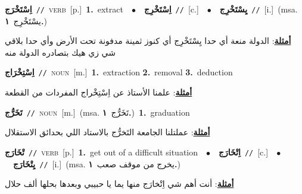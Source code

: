 \documentclass[10pt,a4paper,twoside]{article} %
\begin{document}
\begin{multicols}{2}
{\setlength\topsep{0pt}\textbf{\foreignlanguage{arabic}{اِسْتَخْرَج}}\ {\color{gray}\texttt{//}\color{black}}\ \textsc{verb}\ [p.]\ \textbf{1.}~extract\ \ $\bullet$\ \ \setlength\topsep{0pt}\textbf{\foreignlanguage{arabic}{اِسْتَخْرِج}}\ {\color{gray}\texttt{//}\color{black}}\ [c.]\ \ $\bullet$\ \ \setlength\topsep{0pt}\textbf{\foreignlanguage{arabic}{يِسْتَخْرِج}}\ {\color{gray}\texttt{//}\color{black}}\ [i.]\ \color{gray}(msa. \foreignlanguage{arabic}{يسْتَخْرِج}~\foreignlanguage{arabic}{\textbf{١.}})\color{black}\  \begin{flushright}\color{gray}\foreignlanguage{arabic}{\textbf{\underline{\foreignlanguage{arabic}{أمثلة}}}: الدولة منعة أي حدا يِسْتَخْرِج أي كنوز ثمينة مدفونة تحت الأرض وأي حدا بلاقي شي زي هيك بتصادره الدولة منه}\end{flushright}\color{black}} \vspace{2mm}

{\setlength\topsep{0pt}\textbf{\foreignlanguage{arabic}{اِسْتِخْرَاج}}\ {\color{gray}\texttt{//}\color{black}}\ \textsc{noun}\ [m.]\ \textbf{1.}~extraction  \textbf{2.}~removal  \textbf{3.}~deduction\  \begin{flushright}\color{gray}\foreignlanguage{arabic}{\textbf{\underline{\foreignlanguage{arabic}{أمثلة}}}: علمنا الأستاذ عن اِسْتِخْراج المفردات من القطعة}\end{flushright}\color{black}} \vspace{2mm}

{\setlength\topsep{0pt}\textbf{\foreignlanguage{arabic}{تَخَرُّج}}\ {\color{gray}\texttt{//}\color{black}}\ \textsc{noun}\ [m.]\ \color{gray}(msa. \foreignlanguage{arabic}{تَخَرُّج}~\foreignlanguage{arabic}{\textbf{١.}})\color{black}\ \textbf{1.}~graduation\  \begin{flushright}\color{gray}\foreignlanguage{arabic}{\textbf{\underline{\foreignlanguage{arabic}{أمثلة}}}: عملتلنا الجامعة التَخرُّج بالاستاد اللي بحدائق الاستقلال}\end{flushright}\color{black}} \vspace{2mm}

{\setlength\topsep{0pt}\textbf{\foreignlanguage{arabic}{تْخَارَج}}\ {\color{gray}\texttt{//}\color{black}}\ \textsc{verb}\ [p.]\ \textbf{1.}~get out of a difficult situation\ \ $\bullet$\ \ \setlength\topsep{0pt}\textbf{\foreignlanguage{arabic}{اِتْخَارَج}}\ {\color{gray}\texttt{//}\color{black}}\ [c.]\ \ $\bullet$\ \ \setlength\topsep{0pt}\textbf{\foreignlanguage{arabic}{يِتْخَارَج}}\ {\color{gray}\texttt{//}\color{black}}\ [i.]\ \color{gray}(msa. \foreignlanguage{arabic}{يخرج من موقف صعب}~\foreignlanguage{arabic}{\textbf{١.}})\color{black}\  \begin{flushright}\color{gray}\foreignlanguage{arabic}{\textbf{\underline{\foreignlanguage{arabic}{أمثلة}}}: أنت أهم شي اِتْخارَج منها يما يا حبيبي وبعدها بحلها ألف حلال}\end{flushright}\color{black}} \vspace{2mm}


\end{multicols}
\end{document}
